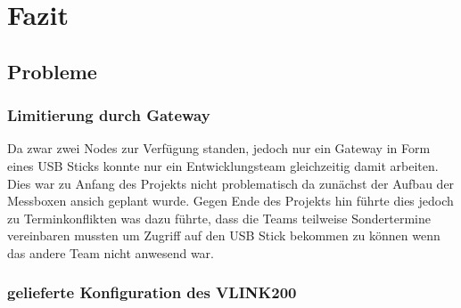 \chapter{Fazit}
\label{cha:fazit}
\todo{}
\section{Probleme}
\label{sec:probleme}
\subsection{Limitierung durch Gateway}
Da zwar zwei Nodes zur Verfügung standen, jedoch nur ein Gateway in Form eines USB Sticks konnte nur ein Entwicklungsteam gleichzeitig damit arbeiten.
Dies war zu Anfang des Projekts nicht problematisch da zunächst der Aufbau der Messboxen ansich geplant wurde.
Gegen Ende des Projekts hin führte dies jedoch zu Terminkonflikten was dazu führte,
dass die Teams teilweise Sondertermine vereinbaren mussten um Zugriff auf den USB Stick bekommen zu können wenn das andere Team nicht anwesend war.

\subsection{gelieferte Konfiguration des VLINK200}\
